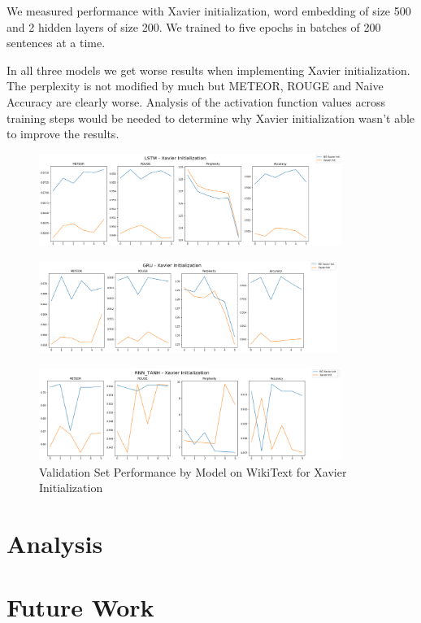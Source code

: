 \documentclass[a4paper]{article}
\begin{document}
We measured performance with Xavier initialization, word embedding of size 500 and 2 hidden layers of size 200.
We trained to five epochs in batches of 200 sentences at a time.
 
In all three models we get worse results when implementing Xavier initialization. The perplexity is not modified
by much but METEOR, ROUGE and Naive Accuracy are clearly worse. Analysis of the activation function values across training steps
would be needed to determine why Xavier initialization wasn't able to improve the results.

\begin{figure}[!ht]
\includegraphics[width=\textwidth, height=3cm]{lstm-xi}
\centering
\end{figure}
\begin{figure}[!ht]
\includegraphics[width=\textwidth, height=3cm]{gru-xi}
\centering
\end{figure}
\begin{figure}[!ht]
\includegraphics[width=\textwidth, height=3cm]{tanh-xi}
\centering
\caption{Validation Set Performance by Model on WikiText for Xavier Initialization}
\end{figure}


\section{Analysis}
\label{sec:analysis}

\section{Future Work}
\label{sec:future}
\end{document}
